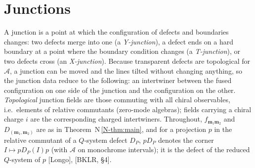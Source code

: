 \documentclass[11pt]{article}
\theoremstyle{definition}
\theoremstyle{remark}
\newcommand{\cA}{\mathcal A}
\newcommand{\nref}[1]{N\,\ref{N-#1}}
\begin{document}
\section{Junctions}\label{sec:junctions}
A junction is a point at which the configuration of defects and boundaries changes: two defects merge into one (a \emph{Y-junction}), a defect ends on a hard boundary at a point where the boundary condition changes (a \emph{T-junction}), or two defects cross (an \emph{X-junction}). Because transparent defects are topological for $\cA$, a junction can be moved and the lines tilted without changing anything, so the junction data reduce to the following: an intertwiner between the fused configuration on one side of the junction and the configuration on the other. \emph{Topological} junction fields are those commuting with all chiral observables, i.e.\ elements of relative commutants (zero-mode algebras); fields carrying a chiral charge $i$ are the corresponding charged intertwiners. Throughout, $f_{\mathbf m_1\mathbf m_2}$ and $D_{(\mathbf m_1,\mathbf m_2)}$ are as in Theorem~\nref{thm:main}, and for a projection $p$ in the relative commutant of a $Q$-system defect $D_P$, $pD_P$ denotes the corner $I\mapsto pD_P(I)p$ (with $\cA$ on monochrome intervals); it is the defect of the reduced $Q$-system of $p$ [Longo], [BKLR, \S4].
\end{document}
